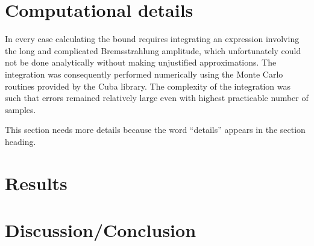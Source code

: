 \documentclass[10pt,a4paper]{article}
\begin{document}
	
	
	\section{Computational details}
	In every case calculating the bound requires integrating an expression involving the long and complicated Bremsstrahlung amplitude, which unfortunately could not be done analytically without making unjustified approximations. The integration was consequently performed numerically using the Monte Carlo routines provided by the Cuba library. The complexity of the integration was such that errors remained relatively large even with highest practicable number of samples. 

        This section needs more details because the word ``details'' appears in the section heading.

	\section{Results}
	\section{Discussion/Conclusion}	
	
	
%		
		
\end{document}
